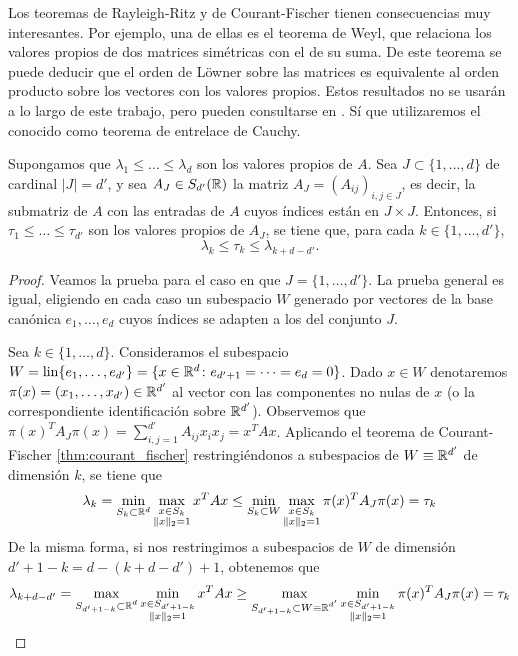Los teoremas de Rayleigh-Ritz y de Courant-Fischer tienen consecuencias muy interesantes. Por ejemplo, una de ellas es el teorema de Weyl, que relaciona los valores propios de dos matrices simétricas con el de su suma. De este teorema se puede deducir que el orden de Löwner sobre las matrices es equivalente al orden producto sobre los vectores con los valores propios. Estos resultados no se usarán a lo largo de este trabajo, pero pueden consultarse en \cite{matrix_analysis,zhang2011matrix}. Sí que utilizaremos el conocido como teorema de entrelace de Cauchy.

\begin{thm} \label{thm:interlacing}
    Supongamos que $\lambda_1 \le \dots \le \lambda_d$ son los valores propios de $A$. Sea $J \subset \{1, \dots, d\}$ de cardinal $|J| = d'$, y sea $A_J \in S_{d'}(\mathbb{R})$ la matriz $A_J = (A_{ij})_{i,j \in J}$, es decir, la submatriz de $A$ con las entradas de $A$ cuyos índices están en $J \times J$. Entonces, si $\tau_1 \le \dots \le \tau_{d'}$ son los valores propios de $A_J$, se tiene que, para cada $k \in \{1,\dots,d'\}$,
    \[ \lambda_k \le \tau_k \le \lambda_{k+d-d'}. \]
\end{thm}

\begin{proof}
    Veamos la prueba para el caso en que $J = \{1,\dots,d'\}$. La prueba general es igual, eligiendo en cada caso un subespacio $W$ generado por vectores de la base canónica $e_1, \dots, e_d$ cuyos índices se adapten a los del conjunto $J$. 

    Sea $k \in \{1,\dots,d\}$. Consideramos el subespacio $W = \operatorname{lin}\{e_1,\dots,e_{d'}\} = \{ x \in \mathbb{R}^d \colon e_{d'+1} = \dots = e_d = 0\}$. Dado $x \in W$ denotaremos $\pi(x) = (x_1,\dots,x_{d'}) \in \mathbb{R}^{d'}$ al vector con las componentes no nulas de $x$ (o la correspondiente identificación sobre $\mathbb{R}^{d'}$). Observemos que $\pi(x)^TA_J\pi(x) = \sum_{i,j=1}^{d'}A_{ij}x_ix_j = x^TAx$. Aplicando el teorema de Courant-Fischer \ref{thm:courant_fischer} restringiéndonos a subespacios de $W \equiv \mathbb{R}^{d'}$ de dimensión $k$, se tiene que
    \[ \lambda_k = \min_{S_k \subset \mathbb{R}^d} \max_{\substack{x \in S_k \\ \|x\|_2 = 1}} x^TAx \le \min_{S_k \subset W} \max_{\substack{x \in S_k \\ \|x\|_2 = 1}} \pi(x)^TA_J\pi(x) = \tau_k  \]
    De la misma forma, si nos restringimos a subespacios de $W$ de dimensión $d' + 1 -k = d - (k+d-d') + 1$, obtenemos que
    \[  \lambda_{k+d-d'} = \max_{\substack{S_{d'+1-k} \subset \mathbb{R}^d}} \min_{\substack{x \in S_{d'+1-k} \\ \|x\|_2 = 1}} x^TAx \ge \max_{\substack{S_{d'+1-k} \subset W \equiv \mathbb{R}^{d'}}} \min_{\substack{x \in S_{d'+1-k} \\ \|x\|_2 = 1}} \pi(x)^TA_J\pi(x) = \tau_k \]
\end{proof}

